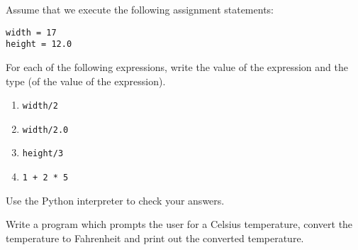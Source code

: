 \begin{ex}
Assume that we execute the following assignment statements:

\begin{verbatim}
width = 17
height = 12.0
\end{verbatim}

For each of the following expressions, write the value of the
expression and the type (of the value of the expression).

\begin{enumerate}

\item {\tt width/2}

\item {\tt width/2.0}

\item {\tt height/3}

\item {\tt 1 + 2 * 5}

\end{enumerate}

Use the Python interpreter to check your answers.
\end{ex}

\begin{ex}
Write a program which prompts the user for a Celsius temperature,
convert the temperature to Fahrenheit and print out the converted
temperature.
\end{ex}


